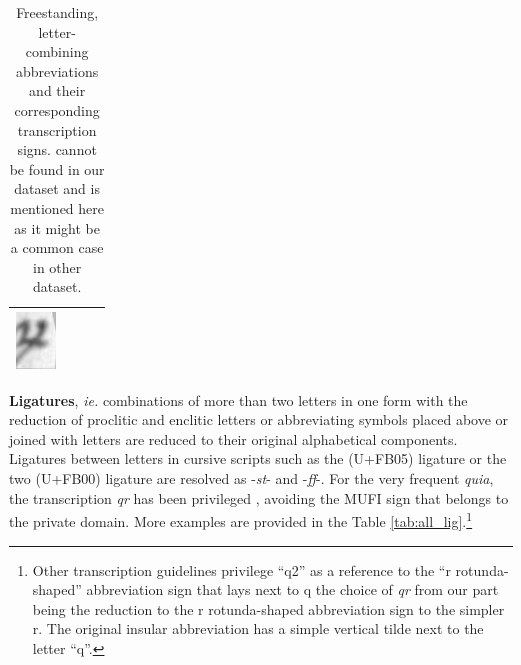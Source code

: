 \documentclass{article}
\newcommand{\juni}[1]{\textsf{\junicodeFont #1}}%
\begin{document}
\begin{table}[H]
{{\begin{tabular}{c|c|c|c}
{            \includegraphics[height=1.5cm]{datapaper/images/examples/-rum/-rum_Latin 16195.png}
            }           
    \\ \hline
    \end{tabular}%
    }}
    \caption{Freestanding, letter-combining abbreviations and their corresponding transcription signs.  cannot be found in our dataset and is mentioned here as it might be a common case in other dataset.}
    \label{tab:all_abbr}
\end{table}

\textbf{Ligatures}, \textit{ie.} combinations of more than two letters in one form with the reduction of proclitic and enclitic letters or abbreviating symbols placed above or joined with letters are reduced to their original alphabetical components. Ligatures between letters in cursive scripts such as the \juni{} (U+FB05) ligature or the two \juni{} (U+FB00) ligature are resolved as -\textit{st}- and -\textit{ff}-. For the very frequent \textit{quia}, the transcription \textit{qr} has been privileged , avoiding the MUFI sign \juni{} that belongs to the private domain. More examples are provided in the Table \ref{tab:all_lig}.\footnote{Other transcription guidelines privilege ``q2'' as a reference to the ``r rotunda-shaped'' abbreviation sign that lays next to q the choice of \textit{qr} from our part being the reduction to the r rotunda-shaped abbreviation sign to the simpler r. The original insular abbreviation has a simple vertical tilde next to the letter ``q''.}
\end{document}
